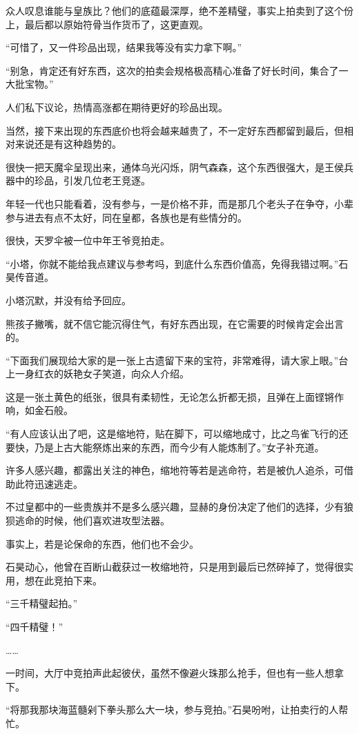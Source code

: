 众人叹息谁能与皇族比？他们的底蕴最深厚，绝不差精璧，事实上拍卖到了这个份上，最后都以原始符骨当作货币了，这更直观。

“可惜了，又一件珍品出现，结果我等没有实力拿下啊。”

“别急，肯定还有好东西，这次的拍卖会规格极高精心准备了好长时间，集合了一大批宝物。”

人们私下议论，热情高涨都在期待更好的珍品出现。

当然，接下来出现的东西底价也将会越来越贵了，不一定好东西都留到最后，但相对来说还是有这种趋势的。

很快一把天魔伞呈现出来，通体乌光闪烁，阴气森森，这个东西很强大，是王侯兵器中的珍品，引发几位老王竞逐。

年轻一代也只能看着，没有参与，一是价格不菲，而是那几个老头子在争夺，小辈参与进去有点不太好，同在皇都，各族也是有些情分的。

很快，天罗伞被一位中年王爷竞拍走。

“小塔，你就不能给我点建议与参考吗，到底什么东西价值高，免得我错过啊。”石昊传音道。

小塔沉默，并没有给予回应。

熊孩子撇嘴，就不信它能沉得住气，有好东西出现，在它需要的时候肯定会出言的。

“下面我们展现给大家的是一张上古遗留下来的宝符，非常难得，请大家上眼。”台上一身红衣的妖艳女子笑道，向众人介绍。

这是一张土黄色的纸张，很具有柔韧性，无论怎么折都无损，且弹在上面铿锵作响，如金石般。

“有人应该认出了吧，这是缩地符，贴在脚下，可以缩地成寸，比之鸟雀飞行的还要快，乃是上古大能祭炼出来的东西，而今少有人能炼制了。”女子补充道。

许多人感兴趣，都露出关注的神色，缩地符等若是逃命符，若是被仇人追杀，可借助此符迅速逃走。

不过皇都中的一些贵族并不是多么感兴趣，显赫的身份决定了他们的选择，少有狼狈逃命的时候，他们喜欢进攻型法器。

事实上，若是论保命的东西，他们也不会少。

石昊动心，他曾在百断山截获过一枚缩地符，只是用到最后已然碎掉了，觉得很实用，想在此竞拍下来。

“三千精璧起拍。”

“四千精璧！”

……

一时间，大厅中竞拍声此起彼伏，虽然不像避火珠那么抢手，但也有一些人想拿下。

“将那我那块海蓝髓剁下拳头那么大一块，参与竞拍。”石昊吩咐，让拍卖行的人帮忙。

